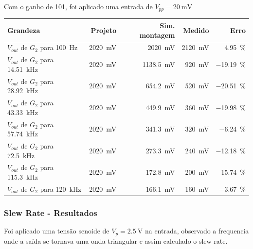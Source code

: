 \documentclass[11pt,a4paper]{article}
\begin{document}
Com o ganho de 101, foi aplicado uma entrada de $V_{pp} = \SI{20}{\milli\volt} $

\begin{center}
\begin{tabular}{@{}lrrrr@{}}
\toprule
\textbf{Grandeza} & \textbf{Projeto} & \textbf{Sim. montagem} & \textbf{Medido} &
\textbf{Erro} \\
\midrule
$V_{out}$ de $G_2$ para \SI{100}{\hertz} & \SI{2020}{\milli\volt} & \SI{2020}{\milli\volt} & \SI{2120}{\milli\volt} & \SI{+4,95}{\percent} \\
$V_{out}$ de $G_2$ para \SI{14,51}{\kilo\hertz} & \SI{2020}{\milli\volt} & \SI{1138,5}{\milli\volt} & \SI{920}{\milli\volt} & \SI{-19,19}{\percent} \\
$V_{out}$ de $G_2$ para \SI{28,92}{\kilo\hertz} & \SI{2020}{\milli\volt} & \SI{654,2}{\milli\volt} & \SI{520}{\milli\volt} & \SI{-20,51}{\percent} \\
$V_{out}$ de $G_2$ para \SI{43,33}{\kilo\hertz} & \SI{2020}{\milli\volt} & \SI{449,9}{\milli\volt} & \SI{360}{\milli\volt} & \SI{-19,98}{\percent} \\
$V_{out}$ de $G_2$ para \SI{57,74}{\kilo\hertz} & \SI{2020}{\milli\volt} & \SI{341,3}{\milli\volt} & \SI{320}{\milli\volt} & \SI{-6,24}{\percent} \\
$V_{out}$ de $G_2$ para \SI{72,5}{\kilo\hertz} & \SI{2020}{\milli\volt} & \SI{273,3}{\milli\volt} & \SI{240}{\milli\volt} & \SI{-12,18}{\percent} \\
$V_{out}$ de $G_2$ para \SI{115,3}{\kilo\hertz} & \SI{2020}{\milli\volt} & \SI{172,8}{\milli\volt} & \SI{200}{\milli\volt} & \SI{+15,74}{\percent} \\
$V_{out}$ de $G_2$ para \SI{120}{\kilo\hertz} & \SI{2020}{\milli\volt} & \SI{166,1}{\milli\volt} & \SI{160}{\milli\volt} & \SI{-3,67}{\percent} \\
\bottomrule
\end{tabular}
\end{center}

\subsubsection{Slew Rate - Resultados}

Foi aplicado uma tensão senoide de $V_p = \SI{2,5}{\volt}$ na entrada, observado a frequencia onde a saída se tornava uma onda triangular e assim calculado o slew rate.
\end{document}
